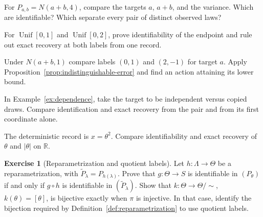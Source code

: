 \documentclass[11pt,oneside]{book}
\theoremstyle{definition}
\newtheorem{exercise}{Exercise}[section]
\theoremstyle{remark}
\newcommand{\R}{\mathbb R}
\begin{document}
\begin{practiceexercise}
\label{wex:translation-invariant-spread}
For $P_{a,b}=N(a+b,4)$, compare the targets $a$, $a+b$, and the variance.
Which are identifiable? Which separate every pair of distinct observed laws?
\end{practiceexercise}

\begin{practiceexercise}
\label{wex:nested-uniform-exact}
For $\operatorname{Unif}[0,1]$ and $\operatorname{Unif}[0,2]$, prove
identifiability of the endpoint and rule out exact recovery at both labels
from one record.
\end{practiceexercise}

\begin{practiceexercise}
\label{wex:additive-mean-bound}
Under $N(a+b,1)$ compare labels $(0,1)$ and $(2,-1)$ for target $a$. Apply
Proposition~\ref{prop:indistinguishable-error} and find an action attaining
its lower bound.
\end{practiceexercise}

\begin{practiceexercise}
\label{wex:diagonal-identifies-scheme}
In Example~\ref{ex:dependence}, take the target to be independent versus
copied draws. Compare identification and exact recovery from the pair and
from its first coordinate alone.
\end{practiceexercise}

\begin{practiceexercise}
\label{wex:squared-record-exact}
The deterministic record is $x=\theta^2$. Compare identifiability and exact
recovery of $\theta$ and $|\theta|$ on $\R$.
\end{practiceexercise}

\begin{exercise}[Reparametrization and quotient labels]
\label{exer:identifiability-reparametrization}
Let $h:\Lambda\to\Theta$ be a reparametrization, with
$\widetilde P_\lambda=P_{h(\lambda)}$.
Prove that $g:\Theta\to S$ is identifiable in $(P_\theta)$ if and only if
$g\circ h$ is identifiable in $(\widetilde P_\lambda)$.
Show that $k:\Theta\to\Theta/{\sim}$, $k(\theta)=[\theta]$, is bijective
exactly when $\pi$ is injective. In that case, identify the bijection
required by Definition~\ref{def:reparametrization} to use quotient labels.
\end{exercise}
\end{document}
